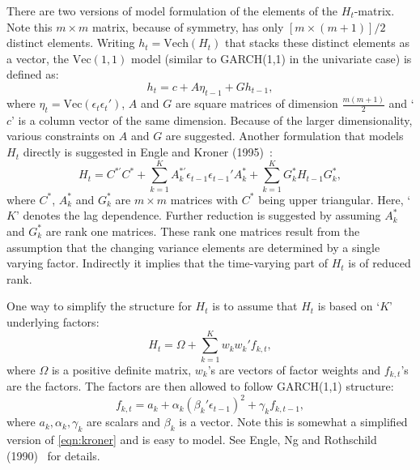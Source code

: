 There are two versions of model formulation of the elements of the $H_t$-matrix. Note this $m \times m$ matrix, because of symmetry, has only $[m \times (m+1)]/2$ distinct elements. Writing $h_t= \text{Vech}(H_t)$ that stacks these distinct elements as a vector, the $\text{Vec}(1,1)$ model (similar to GARCH(1,1) in the univariate case) is defined as:
	\begin{equation} \label{eqn:vecmodel}
	h_t= c + A \eta_{t-1} + G h_{t-1},
	\end{equation}
where $\eta_t= \text{Vec}(\epsilon_t\epsilon_t')$, $A$ and $G$ are square matrices of dimension $\frac{m(m+1)}{2}$ and `$c$' is a column vector of the same dimension. Because of the larger dimensionality, various constraints on $A$ and $G$ are suggested. Another formulation that models $H_t$ directly is suggested in Engle and Kroner (1995)~\cite{kroner}:
	\begin{equation} \label{eqn:kroner}
	H_t= C^{*'} C^* + \sum_{k=1}^K A_k^{*'} \epsilon_{t-1} \epsilon_{t-1}' A_k^* + \sum_{k=1}^K G_k^* H_{t-1}G_k^*,
	\end{equation}
where $C^*$, $A_k^*$ and $G_k^*$ are $m \times m$ matrices with $C^*$ being upper triangular. Here, `$K$' denotes the lag dependence. Further reduction is suggested by assuming $A_k^*$ and $G_k^*$ are rank one matrices. These rank one matrices result from the assumption that the changing variance elements are determined by a single varying factor. Indirectly it implies that the time-varying part of $H_t$ is of reduced rank. 


One way to simplify the structure for $H_t$ is to assume that $H_t$ is based on `$K$' underlying factors:
	\begin{equation} \label{eqn:factorH}
	H_t= \Omega + \sum_{k=1}^K w_k w_k' f_{k,t},
	\end{equation}
where $\Omega$ is a positive definite matrix, $w_k$'s are vectors of factor weights and $f_{k,t}$'s are the factors. The factors are then allowed to follow GARCH(1,1) structure:
	\begin{equation} \label{eqn:garchfactor}
	f_{k,t}= a_k + \alpha_k \left( \beta_k' \epsilon_{t-1} \right)^2 + \gamma_k f_{k,t-1},
	\end{equation}
where $a_k,\alpha_k,\gamma_k$ are scalars and $\beta_k$ is a vector. Note this is somewhat a simplified version of \eqref{eqn:kroner} and is easy to model. See Engle, Ng and Rothschild (1990)~\cite{engleng} for details. 


